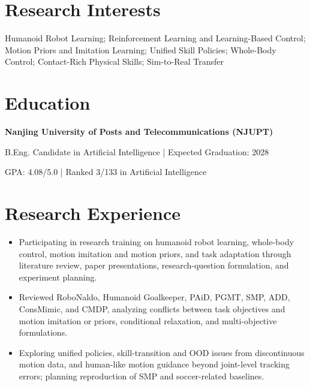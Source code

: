 \documentclass[10pt]{article}
\begin{document}
\fontsize{9}{10.2}\selectfont
{}

\section{Research Interests}\color{black}
Humanoid Robot Learning; Reinforcement Learning and Learning-Based Control; Motion Priors and Imitation Learning; Unified Skill Policies; Whole-Body Control; Contact-Rich Physical Skills; Sim-to-Real Transfer

\section{Education}\color{black}
{\sffamily\color{cvnavy}\bfseries Nanjing University of Posts and Telecommunications (NJUPT)}\par
\vspace{1pt}B.Eng. Candidate in Artificial Intelligence \quad | \quad Expected Graduation: 2028\par
\vspace{1pt}GPA: 4.08/5.0 \quad | \quad Ranked 3/133 in Artificial Intelligence

\section{Research Experience}\color{black}
\begin{itemize}
  \item Participating in research training on humanoid robot learning, whole-body control, motion imitation and motion priors, and task adaptation through literature review, paper presentations, research-question formulation, and experiment planning.
  \item Reviewed RoboNaldo, Humanoid Goalkeeper, PAiD, PGMT, SMP, ADD, ConsMimic, and CMDP, analyzing conflicts between task objectives and motion imitation or priors, conditional relaxation, and multi-objective formulations.
  \item Exploring unified policies, skill-transition and OOD issues from discontinuous motion data, and human-like motion guidance beyond joint-level tracking errors; planning reproduction of SMP and soccer-related baselines.
\end{itemize}
\end{document}
